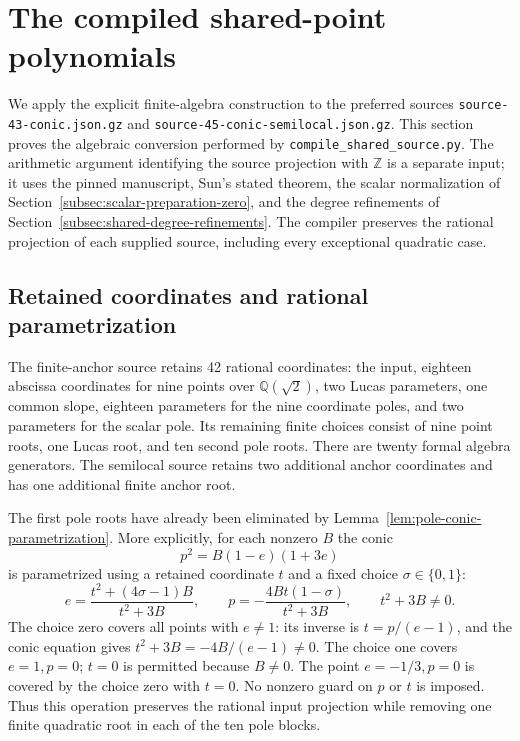 \documentclass[11pt]{article}
\theoremstyle{definition}
\begin{document}
\section{The compiled shared-point polynomials}
\label{sec:compiled-shared-polynomials}

We apply the explicit finite-algebra construction to the preferred
sources \texttt{source-43-conic.json.gz} and
\texttt{source-45-conic-semilocal.json.gz}.  This section proves the
algebraic conversion performed by \texttt{compile\_shared\_source.py}.
The arithmetic argument identifying the source projection with
$\mathbb Z$ is a separate input; it uses the pinned manuscript,
Sun's stated theorem, the scalar normalization of
Section~\ref{subsec:scalar-preparation-zero}, and the degree
refinements of Section~\ref{subsec:shared-degree-refinements}.
The compiler preserves the rational projection of each supplied
source, including every exceptional quadratic case.

\subsection{Retained coordinates and rational parametrization}

The finite-anchor source retains 42 rational coordinates: the
input, eighteen abscissa coordinates for nine points over
$\mathbb Q(\sqrt2)$, two Lucas parameters, one common slope,
eighteen parameters for the nine coordinate poles, and two
parameters for the scalar pole.  Its remaining finite choices
consist of nine point roots, one Lucas root, and ten second
pole roots.  There are twenty formal algebra generators.
The semilocal source retains two additional anchor coordinates
and has one additional finite anchor root.

The first pole roots have already been eliminated by
Lemma~\ref{lem:pole-conic-parametrization}.  More explicitly,
for each nonzero $B$ the conic
\[
                     p^2=B(1-e)(1+3e)
\]
is parametrized using a retained coordinate $t$ and a fixed
choice $\sigma\in\{0,1\}$:
\[
 e=\frac{t^2+(4\sigma-1)B}{t^2+3B},\qquad
 p=-\frac{4Bt(1-\sigma)}{t^2+3B},\qquad t^2+3B\ne0.
\]
The choice zero covers all points with $e\ne1$: its inverse is
$t=p/(e-1)$, and the conic equation gives
$t^2+3B=-4B/(e-1)\ne0$.  The choice one covers $e=1,p=0$;
$t=0$ is permitted because $B\ne0$.  The point $e=-1/3,p=0$
is covered by the choice zero with $t=0$.  No nonzero guard on
$p$ or $t$ is imposed.  Thus this operation preserves the rational
input projection while removing one finite quadratic root in
each of the ten pole blocks.
\end{document}
